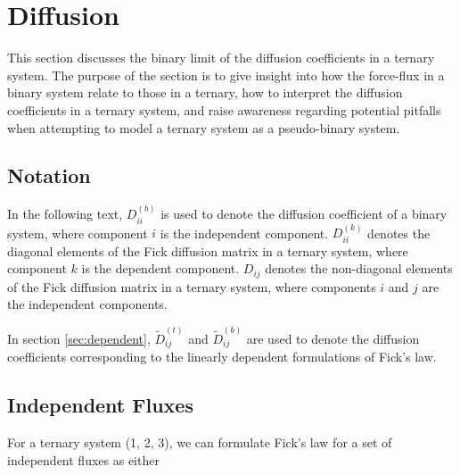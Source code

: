 \section{Diffusion}
This section discusses the binary limit of the diffusion coefficients in a ternary system. The purpose of the section is to give insight into how the force-flux in a binary system relate to those in a ternary, how to interpret the diffusion coefficients in a ternary system, and raise awareness regarding potential pitfalls when attempting to model a ternary system as a pseudo-binary system.

\subsection{Notation}\label{sec:diffusion_notation}

In the following text, $D_{ii}^{(b)}$ is used to denote the diffusion coefficient of a binary system, where component $i$ is the independent component. $D_{ii}^{(k)}$ denotes the diagonal elements of the Fick diffusion matrix in a ternary system, where component $k$ is the dependent component. $D_{ij}$ denotes the non-diagonal elements of the Fick diffusion matrix in a ternary system, where components $i$ and $j$ are the independent components.

In section \ref{sec:dependent}, $\tilde{D}_{ij}^{(t)}$ and $\tilde{D}_{ij}^{(b)}$ are used to denote the diffusion coefficients corresponding to the linearly dependent formulations of Fick's law.

\subsection{Independent Fluxes}\label{sec:diff_indep}

For a ternary system (1, 2, 3), we can formulate Fick's law for a set of independent fluxes as either

